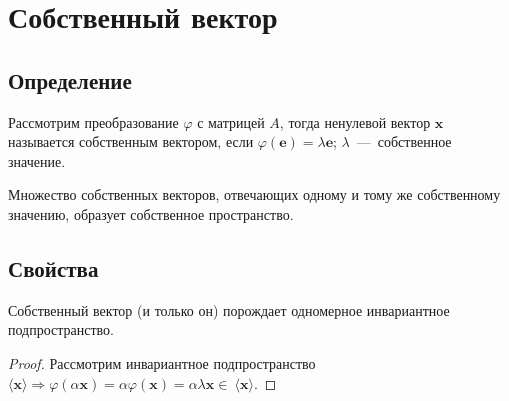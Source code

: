 \section{Собственный вектор}
\subsection{Определение}
Рассмотрим преобразование  $\varphi$ с матрицей $A$, тогда ненулевой вектор $\textbf{x}$ называется \textsf{собственным вектором}, если  $\varphi(\textbf{e}) = \lambda \textbf{e}$; $\lambda$~---~собственное значение. %

Множество собственных векторов, отвечающих одному и тому же собственному значению, образует \textsf{собственное пространство}.
\subsection{Свойства}
\begin{predlog} %
Собственный вектор (и только он) порождает одномерное инвариантное подпространство. %
\end{predlog}
\begin{proof}
Рассмотрим инвариантное подпространство  $\langle \textbf{x} \rangle \Rightarrow \varphi(\alpha \textbf{x}) = \alpha \varphi(\textbf{x}) = \alpha\lambda \textbf{x} \in~\langle \textbf{x}\rangle$.
\end{proof}
